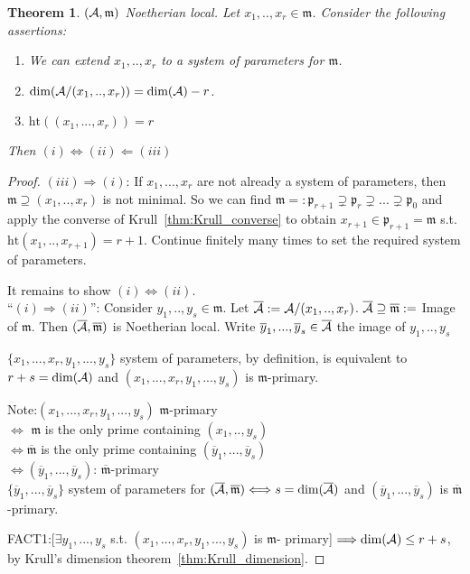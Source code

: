 \documentclass[11pt]{article}
\newtheorem{thm}{Theorem}[section]
\newcommand{\scm}{{\mathfrak m}}
\newcommand{\scp}{{\mathfrak p}}
\newcommand{\cala}{{\cal A}}
\newcommand{\Lrta}{\Longrightarrow}
\newcommand{\Llta}{\Longleftarrow}
\newcommand{\Llrta}{\Longleftrightarrow}
\begin{document}
\begin{thm}\label{thm:system_of_parameters}
$(\cala,\scm)$ Noetherian local. Let $x_1,..,x_r\in\scm$. Consider the following assertions:
\begin{enumerate}[label=(\roman*)]
\item We can extend $x_1,..,x_r$ to a system of parameters for $\scm$.
\item $\text{dim}(\cala/(x_1,..,x_r))=\text{dim}(\cala)-r$.
\item $\text{ht}((x_1,...,x_r))=r$
\end{enumerate}
Then $(i)\Llrta(ii)\Llta(iii)$
\end{thm}
\begin{proof}
$(iii)\Lrta(i)$: If $x_1,...,x_r$ are not already a system of parameters, then $\scm\supseteq(x_1,..,x_r)$ is not minimal. So we can find $\scm=:\scp_{r+1}\supsetneq \scp_r\supsetneq ...\supsetneq \scp_0$ and apply the converse of Krull~\ref{thm:Krull_converse} to obtain $x_{r+1}\in\scp_{r+1}=\scm$ s.t. $\text{ht}(x_1,..,x_{r+1})=r+1$. Continue finitely many times to set the required system of parameters.

It remains to show $(i)\Llrta (ii)$. \\
``$(i)\Lrta(ii)$'': Consider $y_1,..,y_s\in\scm$. Let $\overline{\cala}:=\cala/(x_1,..,x_r)$. $\overline{\cala}\supseteq\overline{\scm}:=$ Image  of $\scm$. Then $(\overline{\cala},\overline{\scm})$ is Noetherian local. Write $\overline{y}_1,...,\overline{y}_s\in\overline{\cala}$ the image of $y_1,..,y_s$

$\{x_1,...,x_r,y_1,...,y_s\}$ system of parameters, by definition, is equivalent to $r+s=\text{dim}(\cala)$ and $(x_1,...,x_r,y_1,...,y_s)$ is $\scm$-primary.

Note:$(x_1,...,x_r,y_1,...,y_s)$ $\scm$-primary\\
$\Llrta$ $\scm$ is the only prime containing $(x_1,..,y_s)$\\
$\Llrta\overline{\scm}$ is the only prime containing $(\overline{y}_1,...,\overline{y}_s)$\\
$\Llrta(\overline{y}_1,...,\overline{y}_s)$: $\overline{\scm}$-primary\\
$\{\overline{y}_1,...,\overline{y}_s\}$ system of parameters for $(\overline{\cala},\overline{\scm})\Llrta s=\text{dim}(\overline{\cala})$ and $(\overline{y}_1,...,\overline{y}_s)$ is $\overline{\scm}$-primary.

FACT1:[$\exists y_1,...,y_s$ s.t. $(x_1,...,x_r,y_1,...,y_s)$ is $\scm$- primary] $\Lrta \text{dim}(\cala)\leq r+s$, by Krull's dimension theorem~\ref{thm:Krull_dimension}.


\end{proof}
\end{document}
